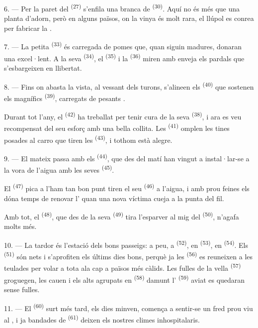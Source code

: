 \VUsaut{6.0mm}
\VUsaut{3.4mm}

6. --- Per la paret del  \textsuperscript{(27)} s'enfila una branca
de  \textsuperscript{(30)}. Aquí no és més que una planta d'adorn,
però en alguns països, on la vinya és molt rara, el llúpol es conrea per fabricar
la .

7. --- La petita  \textsuperscript{(33)} és carregada de pomes que,
quan siguin madures, donaran una  excel·lent. A la seva
 \textsuperscript{(34)}, el  \textsuperscript{(35)} i
la  \textsuperscript{(36)} miren amb enveja els pardals que
s'esbargeixen en llibertat.

8. --- Fins on abasta la vista, al vessant dels turons, s'alineen els
 \textsuperscript{(40)} que sostenen els magnífics 
\textsuperscript{(39)}, carregats de pesants .

Durant tot l'any, el  \textsuperscript{(42)} ha treballat per
tenir cura de la seva  \textsuperscript{(38)}, i ara es veu
recompensat del seu esforç amb una bella collita. Les 
\textsuperscript{(41)} omplen les tines posades al carro que tiren les
 \textsuperscript{(43)}, i tothom està alegre.

\VUsaut{5.0mm}
\VUsaut{3.4mm}

9. --- El mateix passa amb els 
\textsuperscript{(44)}, que des del matí han vingut a instal·lar-se a la vora de
l'aigua amb les seves  \textsuperscript{(45)}.

El  \textsuperscript{(47)} pica a l'ham tan bon punt tiren el seu
 \textsuperscript{(46)} a l'aigua, i amb prou feines els dóna temps de
renovar l' quan una nova víctima cueja a la punta del fil.

Amb tot, el  \textsuperscript{(48)}, que des de la seva
 \textsuperscript{(49)} tira l'esparver al mig del 
\textsuperscript{(50)}, n'agafa molts més.

10. --- La tardor és l'estació dels bons passeigs: a peu, a 
\textsuperscript{(52)}, en  \textsuperscript{(53)}, en
 \textsuperscript{(54)}. Els 
\textsuperscript{(51)} són nets i s'aprofiten els últims dies bons, perquè ja les
 \textsuperscript{(56)} es reuneixen a les teulades per volar a
tota ala cap a països més càlids. Les fulles de la vella 
\textsuperscript{(57)} groguegen, les  cauen i els alts
 agrupats en  \textsuperscript{(58)} damunt
l' \textsuperscript{(59)} aviat es quedaran sense fulles.

11. --- El  \textsuperscript{(60)} surt més tard, els dies minven,
comença a sentir-se un fred prou viu al , i ja bandades de
 \textsuperscript{(61)} deixen els nostres climes inhospitalaris.
\VUsaut{6.0mm}
\VUfilet{22mm}
